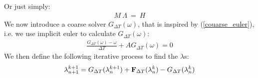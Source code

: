 \documentclass[11pt,a4paper]{article}
\begin{document}
Or just simply:
\begin{align}
M \ \Lambda \ = \ H
\end{align}
We now introduce a coarse solver $G_{\Delta T}(\omega)$, that is inspired by (\ref{couarse_euler}), i.e. we use implicit euler to calculate $G_{\Delta T}(\omega)$:
\begin{align}
\frac{G_{\Delta T}(\omega) -\omega }{\Delta T } + A G_{\Delta T}(\omega) = 0
\end{align}  
We then define the following iterative process to find the $\lambda$s:
\begin{align}
\lambda_{n+1}^{k+1} = G_{\Delta T}(\lambda_{n}^{k+1}) + \bold{F}_{\Delta T}(\lambda_{n}^{k})-G_{\Delta T}(\lambda_{n}^{k})
\end{align} 


\end{document}
